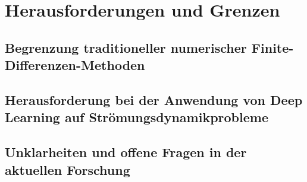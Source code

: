 \section{Herausforderungen und Grenzen}
\subsection{Begrenzung traditioneller numerischer Finite-Differenzen-Methoden}

\subsection{Herausforderung bei der Anwendung von Deep Learning auf Strömungsdynamikprobleme}

\subsection{Unklarheiten und offene Fragen in der aktuellen Forschung}